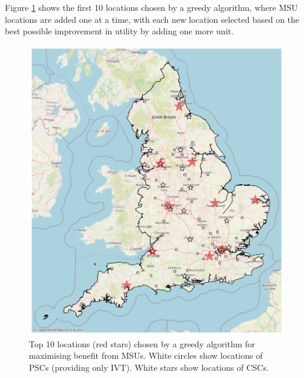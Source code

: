 Figure \ref{fig:top_10} shows the first 10 locations chosen by a greedy algorithm, where MSU locations are added one at a time, with each new location selected based on the best possible improvement in utility by adding one more unit.

\begin{figure}[h!]
    \centering
    \includegraphics[width=1.0\linewidth]{images/top_10_msu_map.jpg}
    \caption{Top 10 locations (red stars) chosen by a greedy algorithm for maximising benefit from MSUs. White circles show locations of PSCs (providing only IVT). White stars show locations of CSCs.}
    \label{fig:top_10}
\end{figure}